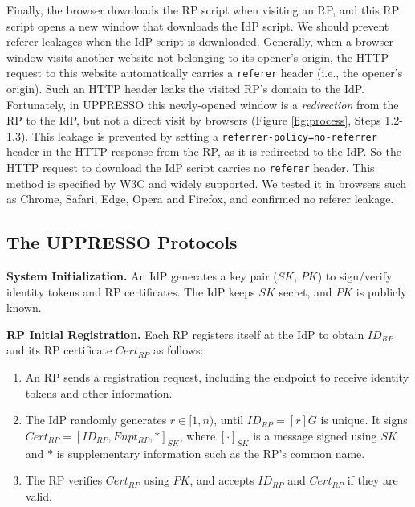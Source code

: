 Finally,
    the browser downloads the RP script when visiting an RP,
     and this RP script opens a new window that downloads the IdP script.
We should prevent referer leakages when the IdP script is downloaded.
Generally, when a browser window visits another website not belonging to its opener's origin,
 the HTTP request to this website automatically carries a \verb+referer+ header (i.e., the opener's origin).
Such an HTTP header leaks the visited RP's domain to the IdP.
Fortunately, in UPPRESSO this newly-opened window is a \emph{redirection} from the RP to the IdP,
 but not a direct visit by browsers (Figure \ref{fig:process}, Steps 1.2-1.3).
This leakage is prevented by setting a \verb+referrer-policy=no-referrer+ header in the HTTP response from the RP,
 as it is redirected to the IdP.
So the HTTP request to download the IdP script carries no \verb+referer+ header.
This method is specified by W3C \cite{referer_policy} and widely supported.
We tested it in browsers such as Chrome, Safari, Edge, Opera and Firefox, and confirmed no referer leakage.




\subsection{The UPPRESSO Protocols}
\label{implementations}

\noindent \textbf{System Initialization.}
An IdP generates a key pair ($SK$, $PK$) to sign/verify identity tokens and RP certificates.
The IdP keeps $SK$ secret, and $PK$ is publicly known.


\vspace{1mm}
\noindent\textbf{RP Initial Registration.}
Each RP registers itself at the IdP to obtain $ID_{RP}$
 and its RP certificate $Cert_{RP}$ as follows:
\vspace{-\topsep}\begin{enumerate}
\setlength{\topsep}{0pt}
\setlength{\partopsep}{0pt}
\setlength{\itemsep}{0pt}
\setlength{\parsep}{0pt}
\setlength{\parskip}{0pt}
\item
An RP sends a registration request, including the endpoint to receive identity tokens
    and other information.
\item
The IdP randomly generates $r \in [1,n)$, until $ID_{RP} = [r]G$ is unique.
It signs $Cert_{RP} = [ID_{RP}, Enpt_{RP}, *]_{SK}$,
     where $[\cdot]_{SK}$ is a message signed using $SK$ and $*$ is supplementary information such as the RP's common name.
\item
The RP verifies $Cert_{RP}$ using $PK$,
    and accepts $ID_{RP}$ and $Cert_{RP}$ if they are valid.
\end{enumerate}


